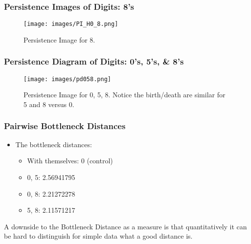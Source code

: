 		
				\begin{frame}
		\frametitle{Persistence Images of Digits: 8's}
		
		\begin{figure}
				\centering
				\texttt{[image: images/PI\_H0\_8.png]}
				\caption{Persistence Image for 8.}
		\end{figure}
		\end{frame}
		
				\begin{frame}
		\frametitle{Persistence Diagram of Digits: 0's, 5's, \& 8's}
		
		\begin{figure}
				\centering
				\texttt{[image: images/pd058.png]}
				\caption{Persistence Image for 0, 5, 8. Notice the birth/death are similar for 5 and 8 versus 0.}
		\end{figure}
		\end{frame}
		
		
		
		
		\begin{frame}
		\frametitle{Pairwise Bottleneck Distances}
		
		\begin{itemize}
			\item The bottleneck distances:
				\begin{itemize}
					\item With themselves: 0 (control)
					\item 0, 5: 2.56941795
					\item 0, 8: 2.21272278
					\item 5, 8: 2.11571217 
				\end{itemize}
		\end{itemize}
		
		A downside to the Bottleneck Distance as a measure is that quantitatively it can be hard to distinguish for simple data what a good distance is.
		\end{frame}